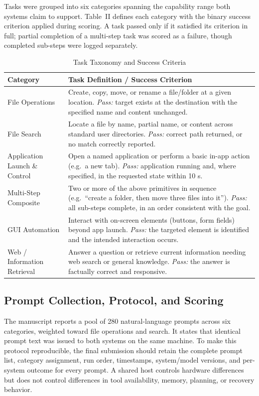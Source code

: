 \documentclass[conference]{IEEEtran}
\begin{document}
Tasks were grouped into six categories spanning the capability range both systems claim to support. Table~II defines each category with the binary success criterion applied during scoring. A task passed only if it satisfied its criterion in full; partial completion of a multi-step task was scored as a failure, though completed sub-steps were logged separately.

\begin{table}[htbp]
\caption{Task Taxonomy and Success Criteria}
\label{tab:taxonomy}
\centering
\small
\begin{tabular}{p{1.9cm}p{5.6cm}}
\toprule
\textbf{Category} & \textbf{Task Definition / Success Criterion} \\
\midrule
File Operations & Create, copy, move, or rename a file/folder at a given location. \emph{Pass:} target exists at the destination with the specified name and content unchanged. \\
File Search & Locate a file by name, partial name, or content across standard user directories. \emph{Pass:} correct path returned, or no match correctly reported. \\
Application Launch \& Control & Open a named application or perform a basic in-app action (e.g.\ a new tab). \emph{Pass:} application running and, where specified, in the requested state within 10 s. \\
Multi-Step Composite & Two or more of the above primitives in sequence (e.g.\ ``create a folder, then move three files into it''). \emph{Pass:} all sub-steps complete, in an order consistent with the goal. \\
GUI Automation & Interact with on-screen elements (buttons, form fields) beyond app launch. \emph{Pass:} the targeted element is identified and the intended interaction occurs. \\
Web / Information Retrieval & Answer a question or retrieve current information needing web search or general knowledge. \emph{Pass:} the answer is factually correct and responsive. \\
\bottomrule
\end{tabular}
\end{table}

\subsection{Prompt Collection, Protocol, and Scoring}

The manuscript reports a pool of 280 natural-language prompts across six categories, weighted toward file operations and search. It states that identical prompt text was issued to both systems on the same machine. To make this protocol reproducible, the final submission should retain the complete prompt list, category assignment, run order, timestamps, system/model versions, and per-system outcome for every prompt. A shared host controls hardware differences but does not control differences in tool availability, memory, planning, or recovery behavior.
\end{document}
